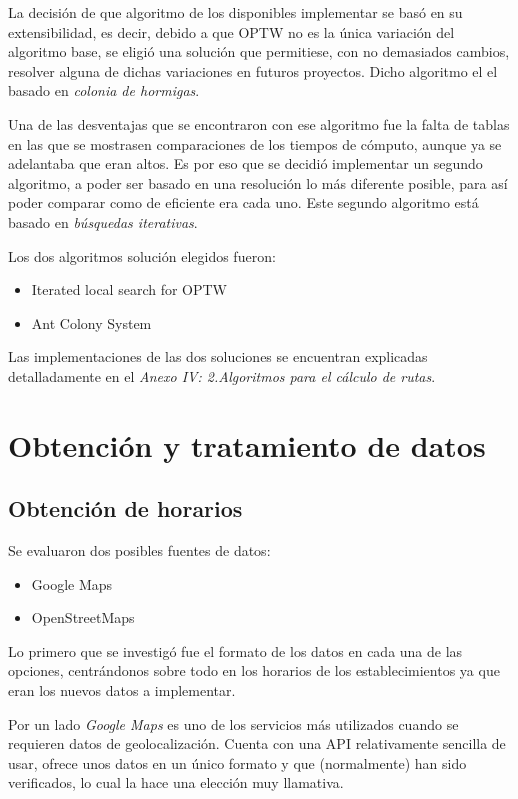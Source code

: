 La decisión de que algoritmo de los disponibles implementar se basó en su extensibilidad, es decir, debido a que OPTW no es la única variación del algoritmo base, se eligió una solución que permitiese, con no demasiados cambios, resolver alguna de dichas variaciones en futuros proyectos. Dicho algoritmo el el basado en \textit{colonia de hormigas}.

Una de las desventajas que se encontraron con ese algoritmo fue la falta de tablas en las que se mostrasen comparaciones de los tiempos de cómputo, aunque ya se adelantaba que eran altos.
Es por eso que se decidió implementar un segundo algoritmo, a poder ser basado en una resolución lo más diferente posible, para así poder comparar como de eficiente era cada uno. Este segundo algoritmo está basado en \textit{búsquedas iterativas}.

Los dos algoritmos solución elegidos fueron:
\begin{itemize}
\tightlist
\item Iterated local search for OPTW
\item Ant Colony System
\end{itemize}
Las implementaciones de las dos soluciones se encuentran explicadas detalladamente en el \textit{Anexo IV: 2.Algoritmos para el cálculo de rutas}.

\section{Obtención y tratamiento de datos}

\subsection{Obtención de horarios}
Se evaluaron dos posibles fuentes de datos:
\begin{itemize}
\item Google Maps
\item OpenStreetMaps
\end{itemize}

Lo primero que se investigó fue el formato de los datos en cada una de las opciones, centrándonos sobre todo en los horarios de los establecimientos ya que eran los nuevos datos a implementar.

Por un lado \textit{Google Maps} es uno de los servicios más utilizados cuando se requieren datos de geolocalización. Cuenta con una API\cite{wiki:googlemapsapi} relativamente sencilla de usar, ofrece unos datos en un único formato y que (normalmente) han sido verificados, lo cual la hace una elección muy llamativa.

